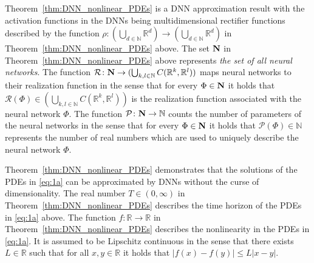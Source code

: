 \documentclass[12pt,AutoFakeBold,AutoFakeSlant]{article}
\theoremstyle{definition}
\newcommand{\R}{\mathbb{R}}
\newcommand{\N}{\mathbb{N}}
\begin{document}
	Theorem~\ref{thm:DNN_nonlinear_PDEs} is a DNN approximation result 
	with the activation functions in the DNNs being multidimensional rectifier functions 
	described by the function 
	$ \rho \colon (\bigcup_{d\in\N}\R^d) \to (\bigcup_{d\in\N}\R^d) $ 
	in Theorem~\ref{thm:DNN_nonlinear_PDEs} above. 
	The set $ {\bf N} $ in Theorem~\ref{thm:DNN_nonlinear_PDEs} above 
	represents \emph{the set of all neural networks}. 
	The function 
	$ 
	\mathcal{R} \colon {\bf N} \to 
	( \bigcup_{ k, l \in \N } C( \R^k, \R^l ) ) 
	$ 
	maps neural networks to their realization function in the sense that for every 
	$ \Phi \in {\bf N} $ 
	it holds that 
	$
	\mathcal{R}( \Phi )
	\in 
	( \bigcup_{ k, l \in \N } C( \R^k, \R^l ) ) 
	$
	is the realization function associated with the neural network $ \Phi $. 
	The function 
	$
	\mathcal{P} \colon {\bf N} \to \N 
	$ 
	counts the number of parameters of the neural networks 
	in the sense that for every 
	$ \Phi \in {\bf N} $ 
	it holds that 
	$
	\mathcal{P}( \Phi ) \in \N
	$
	represents the number of real numbers which are used 
	to uniquely describe the neural network $ \Phi $. 



	Theorem~\ref{thm:DNN_nonlinear_PDEs} demonstrates that the solutions 
	of the PDEs in \eqref{eq:1a} can be approximated by DNNs 
	without the curse of dimensionality. 
	The real number $ T \in (0,\infty) $ in Theorem~\ref{thm:DNN_nonlinear_PDEs} describes 
	the time horizon of the PDEs in \eqref{eq:1a} above. 
	The function $ f \colon \R \to \R $ in Theorem~\ref{thm:DNN_nonlinear_PDEs} 
	describes the nonlinearity 
	in the PDEs in \eqref{eq:1a}. 
	It is assumed to be Lipschitz continuous in the sense that there exists 
	$ L \in \R $ such that for all $ x, y \in \R $ it holds that 
	$ | f(x) - f(y) | \leq L | x - y | $. 
\end{document}
